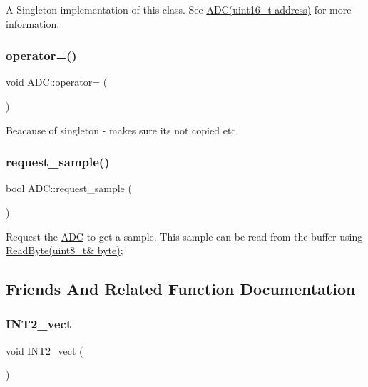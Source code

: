 A Singleton implementation of this class. See \hyperlink{class_a_d_c}{A\+D\+C(uint16\+\_\+t address)} for more information. \hypertarget{class_a_d_c_a8cc7efa85ad7492480bdfd9f49039150}{}\label{class_a_d_c_a8cc7efa85ad7492480bdfd9f49039150} 
\subsubsection{\texorpdfstring{operator=()}{operator=()}}
{\footnotesize\ttfamily void A\+D\+C\+::operator= (\begin{DoxyParamCaption}\item[{const \hyperlink{class_a_d_c}{A\+DC} \&}]{ }\end{DoxyParamCaption})\hspace{0.3cm}{\ttfamily [delete]}}

Beacause of singleton -\/ makes sure its not copied etc. \hypertarget{class_a_d_c_a8264cbf9141f229f5117718e78f01173}{}\label{class_a_d_c_a8264cbf9141f229f5117718e78f01173} 
\subsubsection{\texorpdfstring{request\+\_\+sample()}{request\_sample()}}
{\footnotesize\ttfamily bool A\+D\+C\+::request\+\_\+sample (\begin{DoxyParamCaption}{ }\end{DoxyParamCaption})}

Request the \hyperlink{class_a_d_c}{A\+DC} to get a sample. This sample can be read from the buffer using \hyperlink{class_stream_a6db4180f5834073f992608b856bddca2}{Read\+Byte(uint8\+\_\+t\& byte)}; 

\subsection{Friends And Related Function Documentation}
\hypertarget{class_a_d_c_a8f7964aad4550f29972483135452c811}{}\label{class_a_d_c_a8f7964aad4550f29972483135452c811} 
\subsubsection{\texorpdfstring{I\+N\+T2\+\_\+vect}{INT2\_vect}}
{\footnotesize\ttfamily void I\+N\+T2\+\_\+vect (\begin{DoxyParamCaption}{ }\end{DoxyParamCaption})\hspace{0.3cm}{\ttfamily [friend]}}

